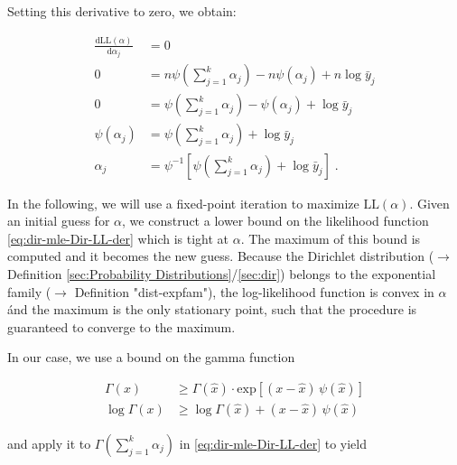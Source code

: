 \documentclass[a4paper,12pt,twoside]{book}
\begin{document}
Setting this derivative to zero, we obtain:

\begin{equation} \label{eq:dir-mle-Dir-dLLdaj-0}
\begin{split}
\frac{\mathrm{d}\mathrm{LL}(\alpha)}{\mathrm{d}\alpha_j} &= 0 \\
0 &= n \psi\left( \sum_{j=1}^k \alpha_j \right) - n \psi(\alpha_j) + n \log \bar{y}_j \\
0 &= \psi\left( \sum_{j=1}^k \alpha_j \right) - \psi(\alpha_j) + \log \bar{y}_j \\
\psi(\alpha_j) &= \psi\left( \sum_{j=1}^k \alpha_j \right) + \log \bar{y}_j \\
\alpha_j &= \psi^{-1} \left[ \psi\left( \sum_{j=1}^k \alpha_j \right) + \log \bar{y}_j \right] \; .
\end{split}
\end{equation}

In the following, we will use a fixed-point iteration to maximize $\mathrm{LL}(\alpha)$. Given an initial guess for $\alpha$, we construct a lower bound on the likelihood function \eqref{eq:dir-mle-Dir-LL-der} which is tight at $\alpha$. The maximum of this bound is computed and it becomes the new guess. Because the Dirichlet distribution ($\rightarrow$ Definition \ref{sec:Probability Distributions}/\ref{sec:dir}) belongs to the exponential family ($\rightarrow$ Definition "dist-expfam"), the log-likelihood function is convex in $\alpha$ ánd the maximum is the only stationary point, such that the procedure is guaranteed to converge to the maximum.

In our case, we use a bound on the gamma function

\begin{equation} \label{eq:dir-mle-gamma-fct-bound}
\begin{split}
\Gamma(x) &\geq \Gamma(\hat{x}) \cdot \mathrm{exp}\left[(x-\hat{x}) \, \psi(\hat{x}) \right] \\
\log \Gamma(x) &\geq \log \Gamma(\hat{x}) + (x-\hat{x}) \, \psi(\hat{x})
\end{split}
\end{equation}

and apply it to $\Gamma\left( \sum_{j=1}^k \alpha_j \right)$ in \eqref{eq:dir-mle-Dir-LL-der} to yield
\end{document}
